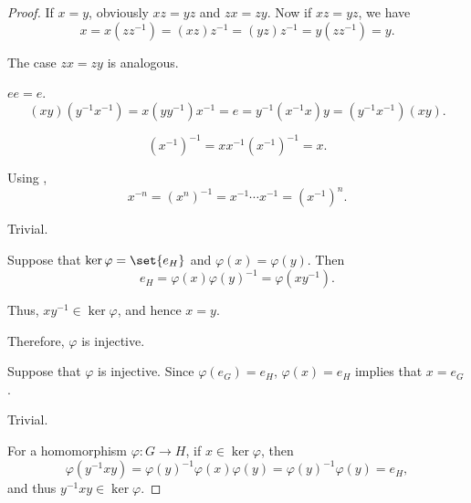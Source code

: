 \begin{proof}
   If \( x = y \), obviously \( xz = yz \) and \( zx = zy \). Now if \( xz = yz \), we have
  \begin{equation*}
    x = x(zz^{-1}) = (xz)z^{-1} = (yz)z^{-1} = y(zz^{-1}) = y.
  \end{equation*}

  The case \( zx = zy \) is analogous.

   \( ee = e \).
  \begin{equation*}
    (xy) (y^{-1} x^{-1})
    =
    x (y y^{-1}) x^{-1}
    =
    e
    =
    y^{-1} (x^{-1} x) y
    =
    (y^{-1} x^{-1}) (xy).
  \end{equation*}

  \begin{equation*}
    (x^{-1})^{-1}
    =
    x x^{-1} (x^{-1})^{-1}
    =
    x.
  \end{equation*}

   Using ,
  \begin{equation*}
    x^{-n}
    =
    (x^n)^{-1}
    =
    x^{-1} \cdots x^{-1}
    =
    (x^{-1})^n.
  \end{equation*}

   Trivial.

  \SufficiencySubProof* Suppose that \( \ker \varphi = \set{ e_H } \) and \( \varphi(x) = \varphi(y) \). Then
  \begin{equation*}
    e_H = \varphi(x) \varphi(y)^{-1} = \varphi(x y^{-1}).
  \end{equation*}

  Thus, \( x y^{-1} \in \ker \varphi \), and hence \( x = y \).

  Therefore, \( \varphi \) is injective.

  \NecessitySubProof* Suppose that \( \varphi \) is injective. Since \( \varphi(e_G) = e_H \), \( \varphi(x) = e_H \) implies that \( x = e_G \).

   Trivial.

   For a homomorphism \( \varphi: G \to H \), if \( x \in \ker \varphi \), then
  \begin{equation*}
    \varphi(y^{-1} x y) = \varphi(y)^{-1} \varphi(x) \varphi(y) = \varphi(y)^{-1} \varphi(y) = e_H,
  \end{equation*}
  and thus \( y^{-1} x y \in \ker \varphi \).
\end{proof}


